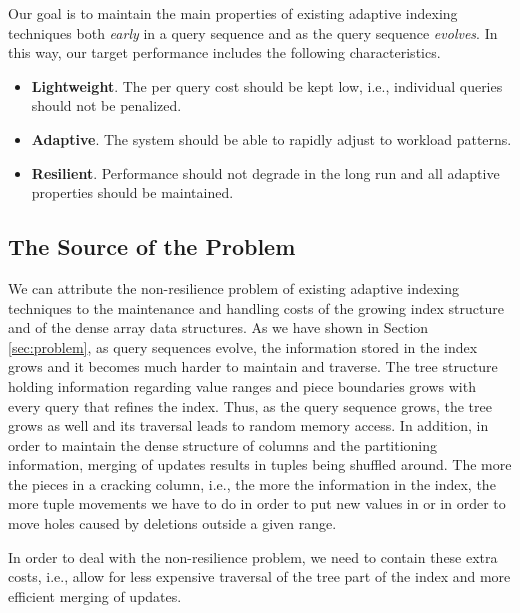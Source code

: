 \documentclass{sig-alternate}
\begin{document}
Our goal is to maintain the main properties of existing adaptive indexing techniques
both {\em early} in a query sequence and as the query sequence {\em evolves}.
In this way, our target performance includes the following characteristics.
\begin{itemize}
\item \textbf{Lightweight}. The per query cost should be kept low, i.e., individual queries should not be penalized.
\vspace{-.5em}%
\item \textbf{Adaptive}. The system should be able to rapidly adjust to workload patterns.
\vspace{-.5em}%
\item \textbf{Resilient}. Performance should not degrade in the long run and all adaptive properties should be maintained.
\end{itemize}

\subsection{The Source of the Problem}

We can attribute the non-resilience problem of existing adaptive indexing techniques to
the maintenance and handling costs of the growing index structure
and of the dense array data structures.
As we have shown in Section \ref{sec:problem}, as query sequences evolve,
the information stored in the index grows and it becomes much harder to maintain and traverse.
The tree structure holding information regarding value ranges and piece boundaries grows with every
query that  refines the index. Thus, as the query sequence grows, the tree grows as well and its traversal
leads to random memory access. In addition, in order to maintain the dense structure  of columns
and the partitioning information,
merging of updates results in tuples being shuffled around.
The more the pieces in a cracking column, i.e., the more the information in the index, the more tuple
movements we have to do in order to put new values in or in order to move holes caused by deletions outside a given range.

In order to deal with the non-resilience problem, we need to contain these extra costs, i.e., allow for
less expensive traversal of the tree part of the index and more efficient merging of updates.
\end{document}
